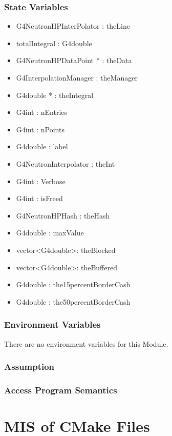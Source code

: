 \documentclass[12pt]{article}
\begin{document}
\subsubsection{State Variables}%
\begin{itemize}
\item G4NeutronHPInterPolator : theLine
\item totalIntegral : G4double
\item G4NeutronHPDataPoint * : theData
\item G4InterpolationManager : theManager
\item G4double * : theIntegral
\item G4int : nEntries
\item G4int : nPoints
\item G4double : label
\item G4NeutronInterpolator : theInt
\item G4int : Verbose
\item G4int : isFreed
\item G4NeutronHPHash : theHash
\item G4double : maxValue
\item vector\textless G4double\textgreater : theBlocked
\item vector\textless G4double\textgreater : theBuffered
\item G4double : the15percentBorderCash
\item G4double : the50percentBorderCash
\end{itemize}

\subsubsection{Environment Variables}%
There are no environment variables for this Module.

\subsubsection{Assumption}%

\subsubsection{Access Program Semantics}%

\section{MIS of CMake Files}
\end{document}
